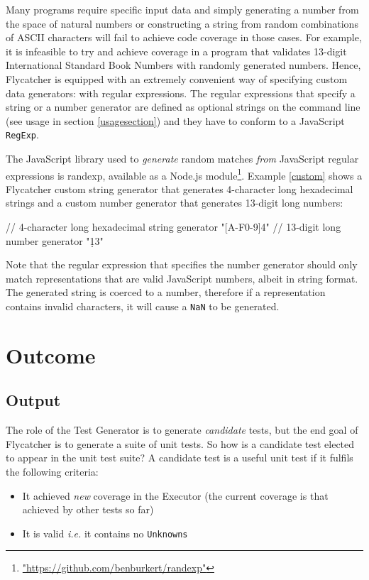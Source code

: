 Many programs require specific input data and simply generating a number from the space of natural numbers or constructing a string from random combinations of ASCII characters will fail to achieve code coverage in those cases. For example, it is infeasible to try and achieve coverage in a program that validates 13-digit International Standard Book Numbers with randomly generated numbers. Hence, \textsf{Flycatcher} is equipped with an extremely convenient way of specifying custom data generators: with regular expressions. The regular expressions that specify a string or a number generator are defined as optional strings on the command line (see usage in section \ref{usagesection}) and they have to conform to a JavaScript \texttt{RegExp}.

The JavaScript library used to \emph{generate} random matches \emph{from} JavaScript regular expressions is \textsf{randexp}, available as a \textsf{Node.js} module\footnote{\url{"https://github.com/benburkert/randexp"}}. Example \ref{custom} shows a \textsf{Flycatcher} custom string generator that generates 4-character long hexadecimal strings and a custom number generator that generates 13-digit long numbers:

\begin{code}[caption=Custom data generators,label=custom]
// 4-character long hexadecimal string generator
"[A-F0-9]{4}"
// 13-digit long number generator
"\d{13}"
\end{code}

Note that the regular expression that specifies the number generator should only match representations that are valid JavaScript numbers, albeit in string format. The generated string is coerced to a number, therefore if a representation contains invalid characters, it will cause a \texttt{NaN} to be generated.

\section{Outcome}
\subsection{Output}
The role of the \textsf{Test Generator} is to generate \emph{candidate} tests, but the end goal of \textsf{Flycatcher} is to generate a suite of unit tests. So how is a candidate test elected to appear in the unit test suite? A candidate test is a useful unit test if it fulfils the following criteria:

\begin{itemize}
   \item It achieved \emph{new} coverage in the \textsf{Executor} (the current coverage is that achieved by other tests so far)
   \item It is valid \emph{i.e.} it contains no \texttt{Unknowns}
\end{itemize}


